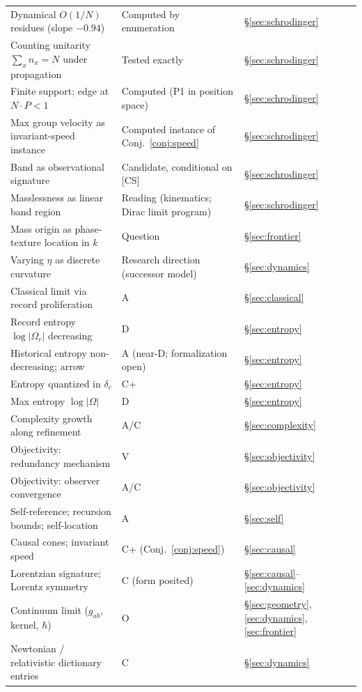 \documentclass[11pt]{article}
\theoremstyle{definition}
\theoremstyle{remark}
\begin{document}
{\begin{longtable}{@{}lll@{}}
Dynamical $O(1/N)$ residues (slope $-0.94$) & Computed by enumeration \cite{TillittSchr} & \S\ref{sec:schrodinger}\\
Counting unitarity $\sum_x n_x = N$ under propagation & Tested exactly \cite{TillittSchr} & \S\ref{sec:schrodinger}\\
Finite support; edge at $N \cdot P < 1$ & Computed (P1 in position space) & \S\ref{sec:schrodinger}\\
Max group velocity as invariant-speed instance & Computed instance of Conj.~\ref{conj:speed} & \S\ref{sec:schrodinger}\\
Band as observational signature & Candidate, conditional on [CS] & \S\ref{sec:schrodinger}\\
Masslessness as linear band region & Reading (kinematics; Dirac limit program) & \S\ref{sec:schrodinger}\\
Mass origin as phase-texture location in $k$ & Question & \S\ref{sec:frontier}\\
Varying $\eta$ as discrete curvature & Research direction (successor model) & \S\ref{sec:dynamics}\\
Classical limit via record proliferation & A & \S\ref{sec:classical}\\
Record entropy $\log|\Omega_r|$ decreasing & D & \S\ref{sec:entropy}\\
Historical entropy non-decreasing; arrow & A (near-D; formalization open) & \S\ref{sec:entropy}\\
Entropy quantized in $\delta_c$ & C+ & \S\ref{sec:entropy}\\
Max entropy $\log|\Omega|$ & D & \S\ref{sec:entropy}\\
Complexity growth along refinement & A/C & \S\ref{sec:complexity}\\
Objectivity: redundancy mechanism & V & \S\ref{sec:objectivity}\\
Objectivity: observer convergence & A/C & \S\ref{sec:objectivity}\\
Self-reference; recursion bounds; self-location & A & \S\ref{sec:self}\\
Causal cones; invariant speed & C+ (Conj.~\ref{conj:speed}) & \S\ref{sec:causal}\\
Lorentzian signature; Lorentz symmetry & C (form posited) & \S\ref{sec:causal}--\ref{sec:dynamics}\\
Continuum limit ($g_{ab}$, kernel, $\hbar$) & O & \S\ref{sec:geometry}, \ref{sec:dynamics}, \ref{sec:frontier}\\
Newtonian / relativistic dictionary entries & C & \S\ref{sec:dynamics}\\

\end{longtable}}
\end{document}
